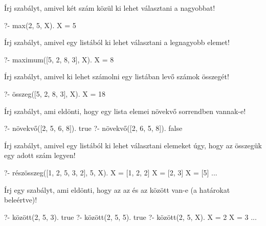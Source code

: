 \begin{problem}
\item Írj szabályt, amivel két szám közül ki
lehet választani a nagyobbat!
\begin{query}
?- max(2, 5, X).
X = 5
\end{query}
\end{problem}
\begin{problem}
\item Írj szabályt, amivel egy listából ki lehet
választani a legnagyobb elemet!
\begin{query}
?- maximum([5, 2, 8, 3], X).
X = 8
\end{query}
\end{problem}
\begin{problem}
\item Írj szabályt, amivel ki lehet számolni egy
listában levő számok összegét!
\begin{query}
?- összeg([5, 2, 8, 3], X).
X = 18
\end{query}
\end{problem}
\begin{problem}
\item Írj szabályt, ami eldönti, hogy egy lista
elemei növekvő sorrendben vannak-e!
\begin{query}
?- növekvő([2, 5, 6, 8]).
true
?- növekvő([2, 6, 5, 8]).
false
\end{query}
\end{problem}
\begin{problem}
\item Írj szabályt, amivel egy listából ki lehet
választani elemeket úgy, hogy az összegük egy
adott szám legyen!
\begin{query}
?- részösszeg([1, 2, 5, 3, 2], 5, X).
X = [1, 2, 2]
X = [2, 3]
X = [5]
...
\end{query}
\end{problem}
\begin{problem}
\item Írj egy  szabályt,
ami eldönti, hogy az  az  és az
 között van-e (a határokat beleértve)!
\begin{query}
?- között(2, 5, 3).
true
?- között(2, 5, 5).
true
?- között(2, 5, X).
X = 2
X = 3
...
\end{query}
\end{problem}
